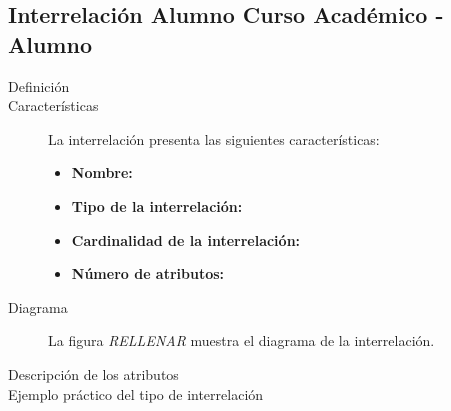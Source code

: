 \subsection{Interrelación Alumno Curso Académico - Alumno}

   \begin{description}
      \item[Definición]

      \item[Características] La interrelación presenta las siguientes
                             características:

         \begin{itemize}
            \item \textbf{Nombre:}
            \item \textbf{Tipo de la interrelación:}
            \item \textbf{Cardinalidad de la interrelación:}
            \item \textbf{Número de atributos:}
         \end{itemize}

      \item[Diagrama] La figura \textit{RELLENAR} muestra el diagrama de la
                      interrelación.

      \item[Descripción de los atributos]

      \item[Ejemplo práctico del tipo de interrelación]
   \end{description}
